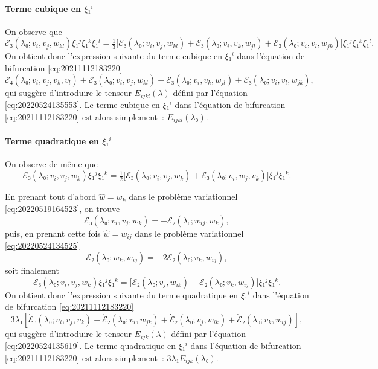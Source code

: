 \documentclass[12pt, final]{scrartcl}
\theoremstyle{definition}
\begin{document}
\paragraph{Terme cubique en \(ξ₁^i\)} On observe que
\begin{equation}
  ℰ₃(λ₀; v_i, v_j, w_{k l}) ξ₁^j ξ₁^k ξ₁^l = \tfrac{1}{3} \bigl[ℰ₃(λ₀; v_i, v_j, w_{k l}) + ℰ₃(λ₀; v_i, v_k, w_{j l}) + ℰ₃(λ₀; v_i, v_l, w_{j k})\bigr] ξ₁^j ξ₁^k ξ₁^l.
\end{equation}
On obtient donc l'expression suivante du terme cubique en \(ξ₁^i\) dans
l'équation de bifurcation \eqref{eq:20211112183220}
\begin{equation}
  ℰ₄(λ₀; v_i, v_j, v_k, v_l) + ℰ₃(λ₀ ; v_i, v_j, w_{k l}) + ℰ₃(λ₀; v_i, v_k, w_{j l}) + ℰ₃(λ₀; v_i, v_l, w_{j k}),
\end{equation}
qui suggère d'introduire le tenseur \(E_{ijkl}(λ)\) défini par l'équation
\eqref{eq:20220524135553}. Le terme cubique en \(ξ₁^i\) dans l'équation de
bifurcation \eqref{eq:20211112183220} est alors simplement~: \(E_{ijkl}(λ₀)\).

\paragraph{Terme quadratique en \(ξ₁^i\)} On observe de même que
\begin{equation}
  ℰ₃(λ₀; v_i, v_j, w_k) ξ₁^j ξ₁^k = \tfrac{1}{2} \bigl[ℰ₃(λ₀; v_i, v_j, w_k) + ℰ₃(λ₀; v_i, w_j, v_k)\bigr] ξ₁^j ξ₁^k.
\end{equation}

En prenant tout d'abord \(\hat{w} = w_k\) dans le problème variationnel
\eqref{eq:20220519164523}, on trouve
\begin{equation}
  ℰ₃(λ₀; v_i, v_j, w_k) = -ℰ₂(λ₀ ; w_{i j}, w_k),
\end{equation}
puis, en prenant cette fois \(\hat{w} = w_{i j}\) dans le problème variationnel
\eqref{eq:20220524134525}
\begin{equation}
  ℰ₂(λ₀; w_k, w_{i j}) = - 2 \dot{ℰ}₂(λ₀; v_k, w_{i j}),
\end{equation}
soit finalement
\begin{equation}
  ℰ₃(λ₀; v_i, v_j, w_k) ξ₁^j ξ₁^k = \bigl[\dot{ℰ}₂(λ₀; v_j, w_{i k}) + \dot{ℰ}₂(λ₀; v_k, w_{i j})\bigr] ξ₁^j ξ₁^k.
\end{equation}
On obtient donc l'expression suivante du terme quadratique en \(ξ₁^i\) dans
l'équation de bifurcation \eqref{eq:20211112183220}
\begin{equation}
  3 λ₁ [\dot{ℰ}₃(λ₀; v_i, v_j, v_k) + \dot{ℰ}₂(λ₀; v_i, w_{j k}) + \dot{ℰ}₂(λ₀; v_j, w_{i k}) + \dot{ℰ}₂(λ₀; v_k, w_{i j})],
\end{equation}
qui suggère d'introduire le tenseur \(E_{ijk}(λ)\) défini par l'équation
\eqref{eq:20220524135619}. Le terme quadratique en \(ξ₁^i\) dans l'équation de
bifurcation \eqref{eq:20211112183220} est alors simplement~:
\(3 λ₁ \dot{E}_{ijk}(λ₀)\).
\end{document}
